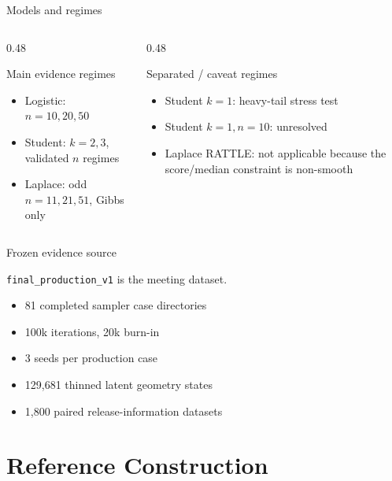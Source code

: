 \documentclass[11pt,aspectratio=169]{beamer}
\newcommand{\claim}[1]{\begin{block}{}\large #1\end{block}}
\begin{document}
\begin{frame}{Models and regimes}
  \begin{columns}[T,onlytextwidth]
    \begin{column}{0.48\textwidth}
      \begin{block}{Main evidence regimes}
        \begin{itemize}
          \item Logistic: $n=10,20,50$
          \item Student: $k=2,3$, validated $n$ regimes
          \item Laplace: odd $n=11,21,51$, Gibbs only
        \end{itemize}
      \end{block}
    \end{column}
    \begin{column}{0.48\textwidth}
      \begin{block}{Separated / caveat regimes}
        \begin{itemize}
          \item Student $k=1$: heavy-tail stress test
          \item Student $k=1,n=10$: unresolved
          \item Laplace RATTLE: not applicable because the score/median constraint is non-smooth
        \end{itemize}
      \end{block}
    \end{column}
  \end{columns}
\end{frame}

\begin{frame}{Frozen evidence source}
  \claim{\texttt{final\_production\_v1} is the meeting dataset.}
  \begin{itemize}
    \item 81 completed sampler case directories
    \item 100k iterations, 20k burn-in
    \item 3 seeds per production case
    \item 129,681 thinned latent geometry states
    \item 1,800 paired release-information datasets
  \end{itemize}
\end{frame}

\section{Reference Construction}
\end{document}
